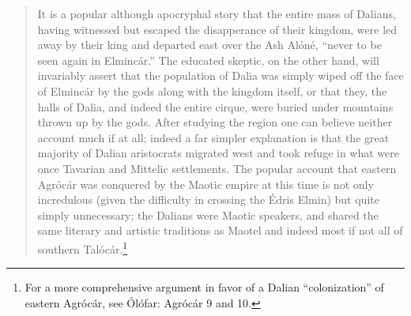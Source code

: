 \documentclass{article}
\begin{document}
\begin{quotation}


It is a popular although apocryphal story that the entire mass of Dalians, having witnessed but escaped the disapperance of their kingdom, were led away by their king and departed east over the Ash Alóné, ``never to be seen again in Elmincár.'' The educated skeptic, on the other hand, will invariably assert that the population of Dalia was simply wiped off the face of Elmincár by the gods along with the kingdom itself, or that they, the halls of Dalia, and indeed the entire cirque, were buried under mountains thrown up by the gods. After studying the region one can believe neither account much if at all; indeed a far simpler explanation is that the great majority of Dalian aristocrats migrated west and took refuge in what were once Tavarian and Mittelic settlements. The popular account that eastern Agrócár was conquered by the Maotic empire at this time is not only incredulous (given the difficulty in crossing the Édris Elmin) but quite simply unnecessary; the Dalians were Maotic speakers, and shared the same literary and artistic traditions as Maotel and indeed most if not all of southern Talócár.\footnote{For a more comprehensive argument in favor of a Dalian ``colonization'' of eastern Agrócár, see Ólófar: Agrócár 9 and 10.}



\end{quotation}
\end{document}
